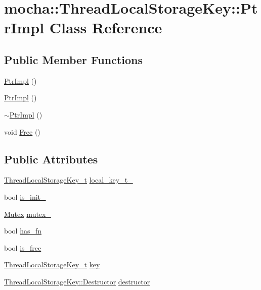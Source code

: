 \hypertarget{classmocha_1_1_thread_local_storage_key_1_1_ptr_impl}{
\section{mocha::ThreadLocalStorageKey::PtrImpl Class Reference}
\label{classmocha_1_1_thread_local_storage_key_1_1_ptr_impl}
}
\subsection*{Public Member Functions}
\begin{DoxyCompactItemize}
\item 
\hyperlink{classmocha_1_1_thread_local_storage_key_1_1_ptr_impl_a9f617a018058e41a9d6c8e6e6d0c181d}{PtrImpl} ()
\item 
\hyperlink{classmocha_1_1_thread_local_storage_key_1_1_ptr_impl_a9f617a018058e41a9d6c8e6e6d0c181d}{PtrImpl} ()
\item 
\hyperlink{classmocha_1_1_thread_local_storage_key_1_1_ptr_impl_a6e6fb73b8600f130ffe982e7f51f47fb}{$\sim$PtrImpl} ()
\item 
void \hyperlink{classmocha_1_1_thread_local_storage_key_1_1_ptr_impl_aa7c064cf17cc69fd70ac1c1103212197}{Free} ()
\end{DoxyCompactItemize}
\subsection*{Public Attributes}
\begin{DoxyCompactItemize}
\item 
\hyperlink{namespacemocha_a47a856b5a5c202b2292502aaaaadce75}{ThreadLocalStorageKey\_\-t} \hyperlink{classmocha_1_1_thread_local_storage_key_1_1_ptr_impl_af28bafd9e0a855ddf6e47659545af3f5}{local\_\-key\_\-t\_\-}
\item 
bool \hyperlink{classmocha_1_1_thread_local_storage_key_1_1_ptr_impl_a1acc401222610dd2f0de7c26428e8e5a}{is\_\-init\_\-}
\item 
\hyperlink{classmocha_1_1_mutex}{Mutex} \hyperlink{classmocha_1_1_thread_local_storage_key_1_1_ptr_impl_af64ffb2cd71d9810a21bb70c7366677b}{mutex\_\-}
\item 
bool \hyperlink{classmocha_1_1_thread_local_storage_key_1_1_ptr_impl_aeb62366cc391935b763c26bfa31a1fac}{has\_\-fn}
\item 
bool \hyperlink{classmocha_1_1_thread_local_storage_key_1_1_ptr_impl_a77edafba95efc89b7406d8ae80153fe0}{is\_\-free}
\item 
\hyperlink{namespacemocha_a47a856b5a5c202b2292502aaaaadce75}{ThreadLocalStorageKey\_\-t} \hyperlink{classmocha_1_1_thread_local_storage_key_1_1_ptr_impl_a4a6a60f8cda2417a27b435e7182980a6}{key}
\item 
\hyperlink{classmocha_1_1_thread_local_storage_key_a4355b1fd8f48df1214686f56bd666897}{ThreadLocalStorageKey::Destructor} \hyperlink{classmocha_1_1_thread_local_storage_key_1_1_ptr_impl_a28d5cce4a4a9cfc1a5646d478031c774}{destructor}
\end{DoxyCompactItemize}


